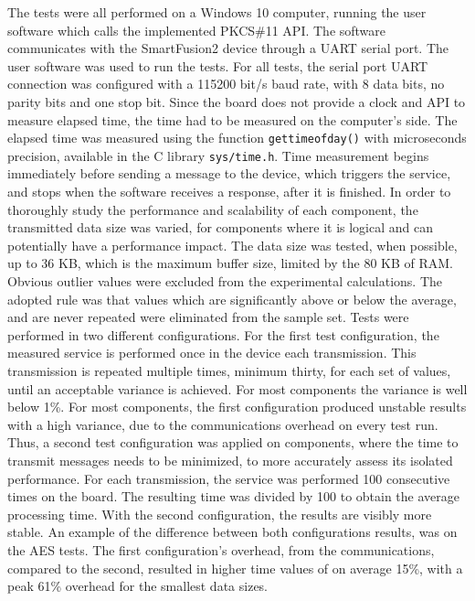 The tests were all performed on a Windows 10 computer, running the user software which calls the implemented PKCS\#11 API. The software communicates with the SmartFusion2 device through a UART serial port. The user software was used to run the tests. %
For all tests, the serial port UART connection was configured with a 115200 bit/s baud rate, with 8 data bits, no parity bits and one stop bit.
Since the board does not provide a clock and API to measure elapsed time, the time had to be measured on the computer's side.
The elapsed time was measured using the function \texttt{gettimeofday()} with microseconds precision, available in the C library \texttt{sys/time.h}.
Time measurement begins immediately before sending a message to the device, which triggers the service, and stops when the software receives a response, after it is finished.
In order to thoroughly study the performance and scalability of each component, the transmitted data size was varied, for components where it is logical and can potentially have a performance impact. The data size was tested, when possible, up to 36 KB, which is the maximum buffer size, limited by the 80 KB of RAM.
Obvious outlier values were excluded from the experimental calculations. The adopted rule was that values which are significantly above or below the average, and are never repeated were eliminated from the sample set.
Tests were performed in two different configurations.
For the first test configuration, the measured service is performed once in the device each transmission. This transmission is repeated multiple times, minimum thirty, for each set of values, until an acceptable variance is achieved. For most components the variance is well below 1\%.
For most components, the first configuration produced unstable results with a high variance, due to the communications overhead on every test run.
Thus, a second test configuration was applied on components, where the time to transmit messages needs to be minimized, to more accurately assess its isolated performance. For each transmission, the service was performed 100 consecutive times on the board. The resulting time was divided by 100 to obtain the average processing time.
With the second configuration, the results are visibly more stable.
An example of the difference between both configurations results, was on the AES tests. The first configuration's overhead, from the communications, compared to the second, resulted in higher time values of on average 15\%, with a peak 61\% overhead for the smallest data sizes.%

